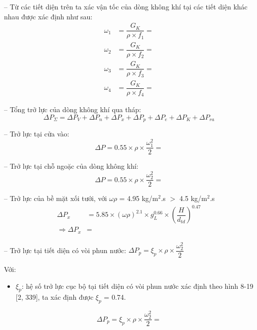 -- Từ các tiết diện trên ta xác vận tốc của dòng không khí tại các tiết diện khác nhau được xác định như sau:
\begin{equation*}
\begin{split}
	\omega_{1} &= \dfrac{G_{K}}{\rho\times f_{1}} = \\
	\omega_{2} &= \dfrac{G_{K}}{\rho\times f_{2}} = \\
	\omega_{3} &= \dfrac{G_{K}}{\rho\times f_{3}} = \\
	\omega_{4} &= \dfrac{G_{K}}{\rho\times f_{4}} = 
\end{split}
\end{equation*}

-- Tổng trở lực của dòng không khí qua tháp:
\begin{equation*}
	\Delta P_{\Sigma} = \Delta P_{V} + \Delta P_{n} + \Delta P_{x} + \Delta P_{p} + \Delta P_{e} + \Delta P_{K} + \Delta P_{ra}
\end{equation*}

-- Trở lực tại cửa vào:
\begin{equation*}
	\Delta P = 0.55\times \rho\times\dfrac{\omega_{1}^2}{2} = 
\end{equation*}

-- Trở lực tại chỗ ngoặc của dòng không khí:
\begin{equation*}
	\Delta P = 0.55\times \rho\times\dfrac{\omega_{2}^2}{2} = 
\end{equation*}

-- Trở lực của bề mặt xối tưới, với $\omega\rho$ = 4.95 kg/m$^2$.s $>$ 4.5 kg/m$^2$.s
\begin{equation*}
	\begin{split}
		\Delta P_{x} &= 5.85\times(\omega\rho)^{2.1}\times g_{L}^{0.66}\times\left(\dfrac{H}{d_{td}}\right)^{0.47}\\
		\Rightarrow \Delta P_{x} &= 
	\end{split}
\end{equation*}

-- Trở lực tại tiết diện có vòi phun nước: $\Delta P_{p} = \xi_{p}\times\rho\times\dfrac{\omega_{2}^2}{2}$

Với:
\begin{itemize}
	\item $\xi_{p}$: hệ số trở lực cục bộ tại tiết diện có vòi phun nước xác định theo hình 8-19 [2, 339], ta xác định được $\xi_{p}$ = 0.74.
\end{itemize}
\begin{equation*}
	\Delta P_{p} = \xi_{p}\times\rho\times\dfrac{\omega_{2}^2}{2} = 
\end{equation*}

